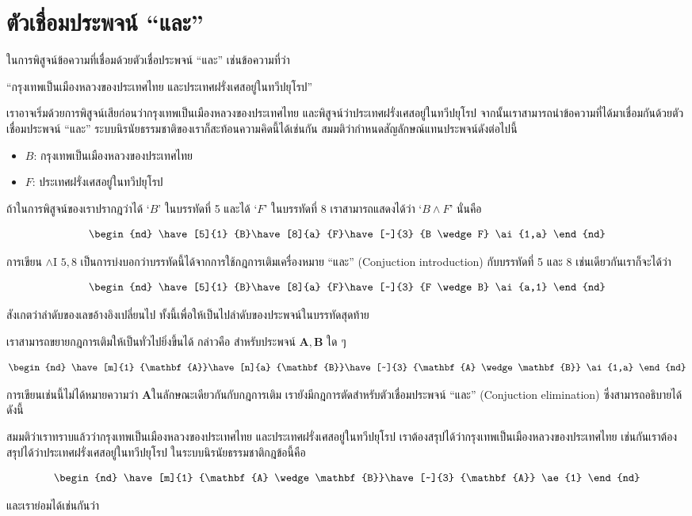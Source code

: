 \documentclass[a4paper,12pt]{extbook}
\theoremstyle{definition}
\theoremstyle{remark}
\newcommand{\fitch}[1]{
	
\begin{minipage}[l]{0.5in}%
		\begin{equation*}%
		\begin{nd}%
		#1	%
		\end{nd}%
		\end{equation*}%
		\vspace{0pt}%
\end{minipage}%

}
\newcommand{\boxthis}[1]{
	\begin{textbox}%
		#1 
	\end{textbox}%
}
\begin{document}
	\section{ตัวเชื่อมประพจน์ ``และ''}
		ในการพิสูจน์ข้อความที่เชื่อมด้วยตัวเชื่อประพจน์ ``และ'' เช่นข้อความที่ว่า
		\begin{center}
				``กรุงเทพเป็นเมืองหลวงของประเทศไทย และประเทศฝรั่งเศสอยู่ในทวีปยุโรป''
		\end{center}
		เราอาจเริ่มด้วยการพิสูจน์เสียก่อนว่ากรุงเทพเป็นเมืองหลวงของประเทศไทย และพิสูจน์ว่าประเทศฝรั่งเศสอยู่ในทวีปยุโรป จากนั้นเราสามารถนำข้อความที่ได้มาเชื่อมกันด้วยตัวเชื่อมประพจน์ ``และ'' ระบบนิรนัยธรรมชาติของเราก็สะท้อนความคิดนี้ได้เช่นกัน สมมติว่ากำหนดสัญลักษณ์แทนประพจน์ดังต่อไปนี้
		\begin{itemize}
			\item[] $B$: กรุงเทพเป็นเมืองหลวงของประเทศไทย
			\item[] $F$: ประเทศฝรั่งเศสอยู่ในทวีปยุโรป
		\end{itemize}		
		ถ้าในการพิสูจน์ของเราปรากฎว่าได้ `$B$' ในบรรทัดที่ 5 และได้ `$F$' ในบรรทัดที่ 8 เราสามารถแสดงได้ว่า `$B \wedge F$' นั่นคือ
		\fitch{
			\have[5]{1}		{B}%
			\have[8]{a}		{F}%
			\have[~]{3}		{B \wedge F}	\ai{1,a}
		}
		การเขียน $\wedge\text{I } 5, 8$ เป็นการบ่งบอกว่าบรรทัดนี้ได้จากการใช้กฎการเติมเครื่องหมาย ``และ'' (Conjuction introduction) กับบรรทัดที่ 5 และ 8 เช่นเดียวกันเราก็จะได้ว่า
		\fitch{
			\have[5]{1}		{B}%
			\have[8]{a}		{F}%
			\have[~]{3}		{F \wedge B}	\ai{a,1}
		}
		สังเกตว่าลำดับของเลขอ้างอิงเปลี่ยนไป ทั้งนี้เพื่อให้เป็นไปลำดับของประพจน์ในบรรทัดสุดท้าย
		
		{\nopagebreak เราสามารถขยายกฎการเติมให้เป็นทั่วไปยิ่งขึ้นได้ กล่าวคือ สำหรับประพจน์ $\mathbf{A}, \mathbf{B}$ ใด ๆ %
		\boxthis{%
			\fitch{		
				\have[m]{1}		{\mathbf{A}}%
				\have[n]{a}		{\mathbf{B}}%
				\have[~]{3}		{\mathbf{A} \wedge \mathbf{B}}	\ai{1,a}
			}
			}
		}
	
		การเขียนเช่นนี้ไม่ได้หมายความว่า $\mathbf{A}$ในลักษณะเดียวกันกับกฎการเติม เรายังมีกฎการตัดสำหรับตัวเชื่อมประพจน์ ``และ'' (Conjuction elimination) ซึ่งสามารถอธิบายได้ดังนี้
		
		สมมติว่าเราทราบแล้วว่ากรุงเทพเป็นเมืองหลวงของประเทศไทย และประเทศฝรั่งเศสอยู่ในทวีปยุโรป เราต้องสรุปได้ว่ากรุงเทพเป็นเมืองหลวงของประเทศไทย เช่นกันเราต้องสรุปได้ว่าประเทศฝรั่งเศสอยู่ในทวีปยุโรป ในระบบนิรนัยธรรมชาติกฎข้อนี้คือ
		
		\begin{textbox}
			\fitch{		
				\have[m]{1}		{\mathbf{A} \wedge \mathbf{B}}%
				\have[~]{3}		{\mathbf{A}}					\ae{1}
			}
		\end{textbox}
		และเราย่อมได้เช่นกันว่า
		
\end{document}
